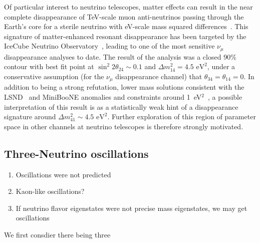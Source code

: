 \documentclass[main.tex]{subfiles}
\begin{document}
Of particular interest to neutrino telescopes, matter effects can result in the near complete disappearance of TeV-scale muon anti-neutrinos passing through the Earth's core for a sterile neutrino with eV-scale mass squared differences~\cite{Nunokawa:2003ep, Choubey:2007ji, Barger:2011rc, Esmaili:2012nz, esmaili2013restricting, Lindner:2015iaa}. This signature of matter-enhanced resonant disappearance has been targeted by the IceCube Neutrino Observatory~\cite{Aartsen_2020, Aartsen_2020_prd}, leading to one of the  most sensitive $\nu_\mu$ disappearance analyses to date. The result of the analysis was a closed 90\% contour with best fit point at $\sin^2 2\theta_{24}\sim0.1$ and $\Delta m^2_{14}=4.5\text{ eV}^2$, under a conservative assumption (for the $\nu_\mu$ disappearance channel) that $\theta_{34}=\theta_{14}=0$. In addition to being a strong refutation, lower mass solutions consistent with the LSND~\cite{Athanassopoulos_1998} and MiniBooNE anomalies and constraints around 1~eV$^2$~\cite{kopp2013sterile, Cirelli:2004cz, abazajian2012light, Gariazzo:2017fdh, Dentler:2017tkw, Diaz:2019fwt}, a possible interpretation of this result is as a statistically weak hint of a disappearance signature around $\Delta m^2_{41}\sim4.5\text{ eV}^2$.  Further exploration of this region of parameter space  in other channels at neutrino telescopes is therefore strongly motivated. 

\subsection{Three-Neutrino oscillations}
\begin{enumerate}
    \item Oscillations were not predicted
    \item Kaon-like oscillations? 
    \item If neutrino flavor eigenstates were not precise mass eigenstates, we may get oscillations 
\end{enumerate}

We first consdier there being three 
\end{document}
